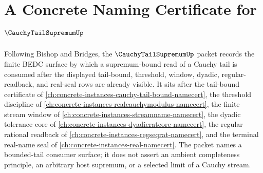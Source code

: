 \chapter{A Concrete Naming Certificate for $\CauchyTailSupremumUp$}
\label{ch:concrete-instances-cauchy-tail-supremum-namecert}

Following Bishop and Bridges, the $\CauchyTailSupremumUp$ packet records the finite BEDC surface by which a supremum-bound read of a Cauchy tail is consumed after the displayed tail-bound, threshold, window, dyadic, regular-readback, and real-seal rows are already visible. It sits after the tail-bound certificate of \autoref{ch:concrete-instances-cauchy-tail-bound-namecert}, the threshold discipline of \autoref{ch:concrete-instances-realcauchymodulus-namecert}, the finite stream window of \autoref{ch:concrete-instances-streamname-namecert}, the dyadic tolerance core of \autoref{ch:concrete-instances-dyadicratcore-namecert}, the regular rational readback of \autoref{ch:concrete-instances-regseqrat-namecert}, and the terminal real-name seal of \autoref{ch:concrete-instances-real-namecert}. The packet names a bounded-tail consumer surface; it does not assert an ambient completeness principle, an arbitrary host supremum, or a selected limit of a Cauchy stream.

